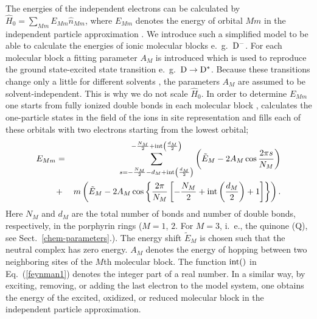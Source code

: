 \documentclass[12pt,twoside,a4paper]{report}
\begin{document}
The energies of the independent electrons can be calculated by $\hat
H_0=\sum_{M{}m}E_{M{}m} \hat n_{M{}m}$, where $E_{M{}m}$
denotes the energy of orbital $M{}m$ in the independent particle
approximation \cite{n11,kili98b}.  
We introduce such a simplified model to be able to calculate
the energies of ionic molecular blocks e.~g.~${\rm D}^-$.
For each molecular block a fitting parameter $A_{M}$
is introduced which is used  to reproduce 
the ground state-excited state transition e.~g.~${\rm D} \rightarrow {\rm D}^*$.
Because these transitions change only a little for different solvents \cite{r4},
the parameters $A_M$ are assumed to be solvent-independent.
This is why we do not scale $\hat H_0$.
In order to determine $E_{M{}m}$ 
one starts from fully ionized
double bonds in each molecular block \cite{kili98b}, calculates the one-particle
states 
in the field of the  ions in site
representation
and fills each of these
orbitals 
with
two electrons  
starting from the lowest
orbital;  
\begin{eqnarray}
\label{feynman1}
E_{M m}&=&
\sum
_{ s
     =   -  \frac{N_M}{2}
         -  %
                d_M 
              + {\rm int}
                \left( 
                    \frac{d_M}{2} 
                \right) 
                                      }
^{       -  \frac{N_M}{2}        
         +  {\rm int} 
            \left(
                 \frac{d_M}{2} 
            \right)                   }
\left( 
    \tilde E_M{}- 2 A_M{}
    \cos{
         \frac{2\pi s}{N_M}
        } 
\right)  \\
&+& m\left(
         \tilde E_M - 2 A_M
         \cos{
              \left\{
                \frac{2 \pi}{N_M} 
                    \left[
                        -   \frac{N_M}{2} 
                        +   {\rm int}
                                   \left(
                                       \frac{d_M}{2} 
                                   \right) + 1
                    \right]
              \right\}
             }
     \right) \nonumber .
\end{eqnarray}
Here $N_M{}$ and $d_M{}$ are
the total number of bonds and 
number of double bonds, respectively, in the %
porphyrin rings 
($M=1$, $2$. For $M=3$, i.~e., the quinone (Q), 
see Sect.~\ref{chem-parameters}.).
The energy shift $\tilde E_M{}$
is chosen
such that the neutral complex has 
zero energy.
$A_M{}$ denotes the energy of hopping between
two neighboring sites  of the $M{}$th molecular block.
The function ${\rm int}()$ in Eq.~(\ref{feynman1}) denotes 
the  integer part of a real number.
In a similar  way,
by exciting, removing, or adding the last 
electron to the model system,
one  obtains
the energy of the excited, oxidized, or reduced
molecular block 
in the independent particle
 approximation.
\end{document}
